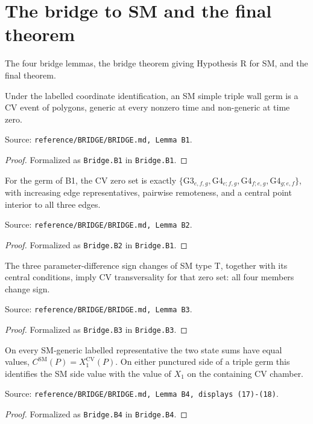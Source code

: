 \chapter{The bridge to SM and the final theorem}
The four bridge lemmas, the bridge theorem giving Hypothesis R for SM, and the final theorem.

\begin{obligation}\label{Bridge:B1}\leanok
Under the labelled coordinate identification, an SM simple triple wall germ is a CV event of polygons, generic at every
nonzero time and non-generic at time zero.

Source: \texttt{reference/BRIDGE/BRIDGE.md, Lemma B1}.
\end{obligation}
\begin{proof}\leanok{}
Formalized as \texttt{Bridge.B1} in \texttt{Bridge.B1}.
\end{proof}

\begin{obligation}\label{Bridge:B2}\leanok
For the germ of B1, the CV zero set is exactly $\{\mathrm{G3}_{e,f,g},\mathrm{G4}_{e;f,g},\mathrm{G4}_{f;e,g},
\mathrm{G4}_{g;e,f}\}$, with increasing edge representatives, pairwise remoteness, and a central point interior to all
three edges.

Source: \texttt{reference/BRIDGE/BRIDGE.md, Lemma B2}.
\end{obligation}
\begin{proof}\leanok{}
Formalized as \texttt{Bridge.B2} in \texttt{Bridge.B1}.
\end{proof}

\begin{obligation}\label{Bridge:B3}\leanok
The three parameter-difference sign changes of SM type T, together with its central conditions, imply CV transversality
for that zero set: all four members change sign.

Source: \texttt{reference/BRIDGE/BRIDGE.md, Lemma B3}.
\end{obligation}
\begin{proof}\leanok{}
Formalized as \texttt{Bridge.B3} in \texttt{Bridge.B3}.
\end{proof}

\begin{obligation}\label{Bridge:B4}\leanok
On every SM-generic labelled representative the two state sums have equal values, $C^{\mathrm{SM}}(P)=X_1^{\mathrm{CV}}(P)$.
On either punctured side of a triple germ this identifies the SM side value with the value of $X_1$ on the containing CV
chamber.

Source: \texttt{reference/BRIDGE/BRIDGE.md, Lemma B4, displays (17)-(18)}.
\end{obligation}
\begin{proof}\leanok{}
Formalized as \texttt{Bridge.B4} in \texttt{Bridge.B4}.
\end{proof}

